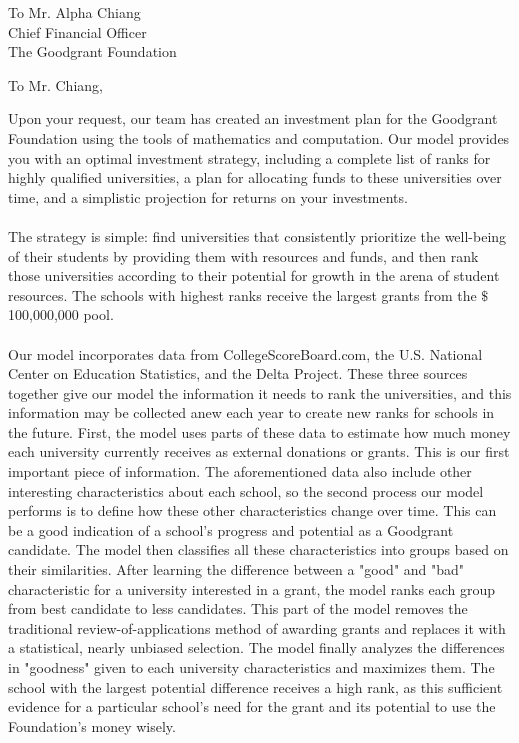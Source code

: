\documentclass[
  fontsize=11pt,
  paper=a4,
  parskip=half,
  enlargefirstpage=on,    %
  fromalign=right,        %
  fromphone=on,           %
  fromrule=aftername,     %
  addrfield=on,           %
  backaddress=on,         %
  subject=beforeopening,  %
  locfield=narrow,        %
  foldmarks=on,           %
]{scrlttr2}
\begin{document}
  \begin{letter}{To Mr. Alpha Chiang \\Chief Financial Officer\\ The Goodgrant Foundation}
    \opening{To Mr. Chiang,}

    Upon your request, our team has created an investment plan for the Goodgrant Foundation using the tools of mathematics and computation. Our model provides you with an optimal investment strategy, including a complete list of ranks for highly qualified universities, a plan for allocating funds to these universities over time, and a simplistic projection for returns on your investments.
    \\\\
    The strategy is simple: find universities that consistently prioritize the well-being of their students by providing them with resources and funds, and then rank those universities according to their potential for growth in the arena of student resources. The schools with highest ranks receive the largest grants from the $\$$100,000,000 pool. 
    \\\\
    Our model incorporates data from CollegeScoreBoard.com, the U.S. National Center on Education Statistics, and the Delta Project. These three sources together give our model the information it needs to rank the universities, and this information may be collected anew each year to create new ranks for schools in the future. First, the model uses parts of these data to estimate how much money each university currently receives as external donations or grants. This is our first important piece of information. The aforementioned data also include other interesting characteristics about each school, so the second process our model performs is to define how these other characteristics change over time. This can be a good indication of a school's progress and potential as a Goodgrant candidate. The model then classifies all these characteristics into groups based on their similarities. After learning the difference between a "good" and "bad" characteristic for a university interested in a grant, the model ranks each group from best candidate to less candidates. This part of the model removes the traditional review-of-applications method of awarding grants and replaces it with a statistical, nearly unbiased selection. The model finally analyzes the differences in "goodness" given to each university characteristics and maximizes them. The school with the largest potential difference receives a high rank, as this sufficient evidence for a particular school's need for the grant and its potential to use the Foundation's money wisely.

\end{letter}
\end{document}
